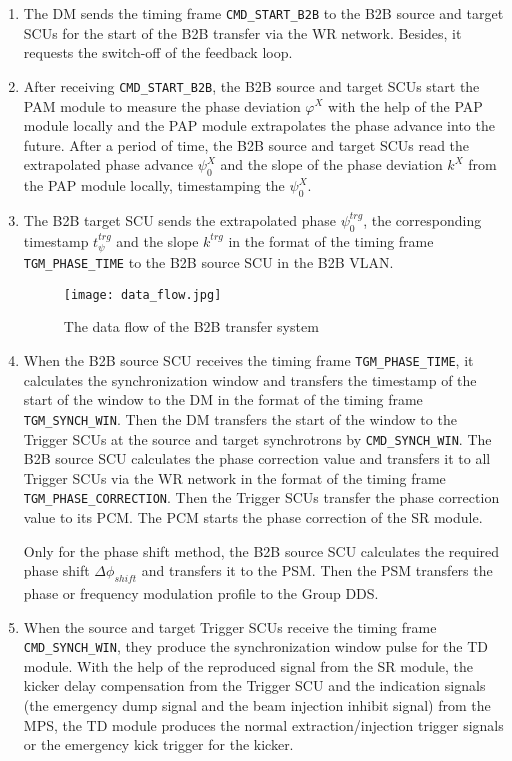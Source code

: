 \begin{enumerate}
\item The DM sends the timing frame \verb|CMD_START_B2B| to the B2B source and target SCUs for the start of the B2B transfer via the WR network. Besides, it requests the switch-off of the feedback loop.

\item  After receiving \verb|CMD_START_B2B|, the B2B source and target SCUs start the PAM module to measure the phase deviation $\varphi^X$ with the help of the PAP module locally and the PAP module extrapolates the phase advance into the future. After a period of time, the B2B source and target SCUs read the extrapolated phase advance $\psi^X_0$ and the slope of the phase deviation $k^\mathit{X}$ from the PAP module locally, timestamping the $\psi^X_0$.  

\item  The B2B target SCU sends the extrapolated phase $\psi^\mathit{trg}_0$, the corresponding timestamp $t_\psi^\mathit{trg}$ and the slope $k^\mathit{trg}$ in the format of the timing frame \verb|TGM_PHASE_TIME| to the B2B source SCU in the B2B VLAN. 
\begin{figure}[!htb]
   \centering   
   \texttt{[image: data\_flow.jpg]}
   \caption{The data flow of the B2B transfer system}
   \label{data_flow}
\end{figure}  

\item  When the B2B source SCU receives the timing frame \verb|TGM_PHASE_TIME|, it calculates the synchronization window and transfers the timestamp of the start of the window to the DM in the format of the timing frame \verb|TGM_SYNCH_WIN|. Then the DM transfers the start of the window to the Trigger SCUs at the source and target synchrotrons by \verb|CMD_SYNCH_WIN|.
The B2B source SCU calculates the phase correction value and transfers it to all Trigger SCUs via the WR network in the format of the timing frame \verb|TGM_PHASE_CORRECTION|. Then the Trigger SCUs transfer the phase correction value to its \gls{PCM}. The PCM starts the phase correction of the SR module. 

Only for the phase shift method, the B2B source SCU calculates the required phase shift $\Delta \phi_\mathit{shift}$ and transfers it to the PSM. Then the PSM transfers the phase or frequency modulation profile to the Group DDS.  

\item  When the source and target Trigger SCUs receive the timing frame \verb|CMD_SYNCH_WIN|, they produce the synchronization window pulse for the TD module. With the help of the reproduced signal from the SR module, the kicker delay compensation from the Trigger SCU and the indication signals (the emergency dump signal and the beam injection inhibit signal) from the MPS, the TD module produces the normal extraction/injection trigger signals or the emergency kick trigger for the kicker.  


\end{enumerate}
